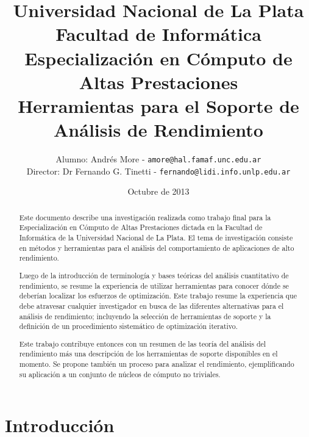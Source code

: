 \documentclass[a4paper]{report}
\begin{document}
\renewcommand{\tablename}{Tabla}

\title{Universidad Nacional de La Plata\\Facultad de Informática\\ \bigskip
  Especialización en Cómputo de Altas Prestaciones\\ \bigskip %
  Herramientas para el Soporte de Análisis de Rendimiento}

\author{
  Alumno: Andrés More - {\tt amore@hal.famaf.unc.edu.ar}\\
  Director: Dr Fernando G. Tinetti - {\tt fernando@lidi.info.unlp.edu.ar}
}

\date{Octubre de 2013}

\maketitle

\begin{abstract}

 Este documento describe una investigación realizada como trabajo final para la Especialización en Cómputo de Altas Prestaciones dictada en la Facultad de Informática de la Universidad Nacional de La Plata. El tema de investigación consiste en métodos y herramientas para el análisis del comportamiento de aplicaciones de alto rendimiento.

  \bigskip

  Luego de la introducción de terminología y bases teóricas del análisis cuantitativo de rendimiento, se resume la experiencia de utilizar herramientas para conocer dónde se deberían localizar los esfuerzos de optimización.  Este trabajo resume la experiencia que debe atravesar cualquier investigador en busca de las diferentes alternativas para el análisis de rendimiento; incluyendo la selección de herramientas de soporte y la definición de un procedimiento sistemático de optimización iterativo.

  \bigskip

  Este trabajo contribuye entonces con un resumen de las teoría del análisis del
  rendimiento más una descripción de los herramientas de soporte 
  disponibles en el momento. Se propone también un proceso para analizar el
  rendimiento, ejemplificando su aplicación a un conjunto de núcleos de
  cómputo no triviales.

\end{abstract}

\tableofcontents

\chapter{Introducción}\label{chap:intro}
\end{document}
